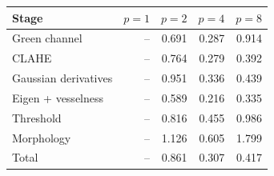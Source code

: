 \begin{tabular}{lrrrr}
\toprule
Stage & $p=1$ & $p=2$ & $p=4$ & $p=8$ \\
\midrule
Green channel & -- & 0.691 & 0.287 & 0.914 \\
CLAHE & -- & 0.764 & 0.279 & 0.392 \\
Gaussian derivatives & -- & 0.951 & 0.336 & 0.439 \\
Eigen + vesselness & -- & 0.589 & 0.216 & 0.335 \\
Threshold & -- & 0.816 & 0.455 & 0.986 \\
Morphology & -- & 1.126 & 0.605 & 1.799 \\
Total & -- & 0.861 & 0.307 & 0.417 \\
\bottomrule
\end{tabular}
